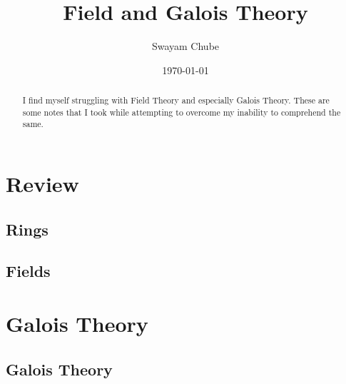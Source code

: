 \documentclass[12pt]{report}
\title{Field and Galois Theory}
\author{Swayam Chube}
\date{\today}
\begin{document}
    \maketitle
    \begin{abstract}
        I find myself struggling with Field Theory and especially Galois Theory. These are some notes that I took while attempting to overcome my inability to comprehend the same.
    \end{abstract}

    \tableofcontents

	\part{Review}
    \chapter{Rings}
	

	\chapter{Fields}
    


	\part{Galois Theory}
	\chapter{Galois Theory}
	
\end{document}
